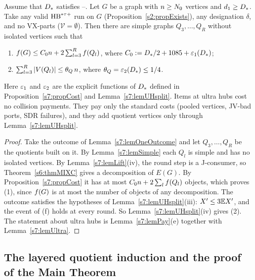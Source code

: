 \begin{theorem}[Theorem JV$^{+*}$]\label{s7:thmJVps}
Assume that $D_{*}$ satisfies --. Let $G$ be a graph with
$n\ge N_{0}$ vertices and $d_1\ge D_{*}$. Take any valid $\mathrm{HB}^{*\tau{+}}$ run on $G$
(Proposition~\ref{s2:propExists}), any designation $\delta$, and no VX-parts
($\mathcal{V}=\emptyset$). Then there are simple graphs $Q_3,\dots,Q_R$ without
isolated vertices such that
\begin{enumerate}
\item[(1)] $f(G)\le C_{0} n+2\sum_{l=3}^{R}f(Q_l)$, where
$C_{0}\mathrel{:=}D_{*}/2+1085+\varepsilon_{1}(D_{*})$;
\item[(2)] $\sum_{l=3}^{R}|V(Q_l)|\le\theta_{Q}\,n$, where
$\theta_{Q}=\varepsilon_{2}(D_{*})\le1/4$.
\end{enumerate}
Here $\varepsilon_{1}$ and $\varepsilon_{2}$ are the explicit functions of $D_{*}$ defined in
Proposition~\ref{s7:propCost} and Lemma~\ref{s7:lemUHsplit}. Items at ultra hubs
cost no collision payments. They pay only the standard costs (pooled vertices,
JV-bad ports, SDR failures), and they add quotient vertices only through
Lemma~\ref{s7:lemUHsplit}.
\deps{\ref{s7:propCost}, \ref{s7:lemUHsplit}, \ref{s7:lemSimple}, \ref{s7:lemLift}, \ref{s7:lemOneOutcome}, \ref{s6:thmMIXC}, \ref{s2:propExists}, \ref{s7:lemPay}, \ref{s7:lemUltra}, \ref{s1:condGamma}}
\end{theorem}

\begin{proof}
Take the outcome of Lemma~\ref{s7:lemOneOutcome} and let $Q_3,\dots,Q_R$ be the
quotients built on it. By Lemma~\ref{s7:lemSimple} each $Q_l$ is simple and has
no isolated vertices. By Lemma~\ref{s7:lemLift}(iv), the round step is a
J-consumer, so Theorem~\ref{s6:thmMIXC} gives a decomposition of $E(G)$. By
Proposition~\ref{s7:propCost} it has at most $C_{0} n+2\sum_lf(Q_l)$ objects,
which proves (1), since $f(G)$ is at most the number of objects of any
decomposition. The outcome satisfies the hypotheses of
Lemma~\ref{s7:lemUHsplit}(iii): $X'\le3\mathbb{E}X'$, and the event of (f) holds at
every round. So Lemma~\ref{s7:lemUHsplit}(iv) gives (2). The statement about
ultra hubs is Lemma~\ref{s7:lemPay}(e) together with Lemma~\ref{s7:lemUltra}.
\end{proof}

\subsection{The layered quotient induction and the proof of the Main Theorem}

